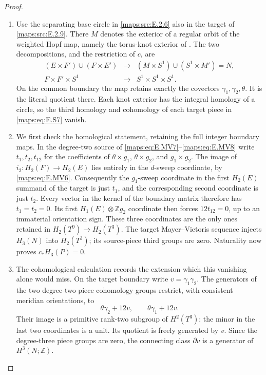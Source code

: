 \begin{proof}
\begin{enumerate}[label=\arabic*.,leftmargin=*]
\item Use the separating base circle in \ref{maps:src:E.2.6} also in the target of
\ref{maps:src:E.2.9}. There $M$ denotes the exterior of a regular orbit of the
weighted Hopf map, namely the torus-knot exterior of . The
two decompositions, and the restriction of $c$, are
\[
 \begin{array}{ccc}
 (E\times F')\cup(F\times E')&\longrightarrow&
                  (M\times S^1)\cup(S^1\times M')=N,\\
 F\times F'\times S^1&\longrightarrow&S^1\times S^1\times S^1.
 \end{array}
 \tag{E.S7}\label{maps:eq:E.S7}
\]
On the common boundary the map retains exactly the covectors
$\gamma_1,\gamma_2,\theta$. It is the literal quotient there.
Each knot exterior has the integral homology of a circle, so the
third homology and cohomology of each target piece in \eqref{maps:eq:E.S7} vanish.

\item We first check the homological statement, retaining the full
integer boundary maps. In the degree-two source of \eqref{maps:eq:E.MV7}--\eqref{maps:eq:E.MV8}
write $t_1,t_2,t_{12}$ for the coefficients of
$\theta\times g_1$, $\theta\times g_2$, and $g_1\times g_2$.
The image of $i_2:H_2(F)\to H_2(E)$ lies entirely in the
$d$-sweep coordinate, by \eqref{maps:eq:E.MV6}. Consequently the $g_1$-sweep
coordinate in the first $H_2(E)$ summand of the target is just
$t_1$, and the corresponding second coordinate is just $t_2$.
Every vector in the kernel of the boundary matrix therefore has
$t_1=t_2=0$. Its first $H_1(E)\otimes\mathbb Zg_2$ coordinate
then forces $12t_{12}=0$, up to an immaterial orientation sign.
These three coordinates are the only ones retained in
$H_2(T^9)\to H_2(T^3)$. The target Mayer--Vietoris sequence
injects $H_3(N)$ into $H_2(T^3)$; its source-piece third groups
are zero. Naturality now proves $c_*H_3(P)=0$.

\item The cohomological calculation records the extension which this
vanishing alone would miss. On the target boundary write
$v=\gamma_1\gamma_2$. The generators of the two degree-two
piece cohomology groups restrict, with consistent meridian
orientations, to
\[
       \theta\gamma_2+12v,
       \qquad \theta\gamma_1+12v.
 \tag{E.S8}\label{maps:eq:E.S8}
\]
Their image is a primitive rank-two subgroup of $H^2(T^3)$:
the minor in the last two coordinates is a unit. Its quotient
is freely generated by $v$. Since the degree-three piece groups
are zero, the connecting class $\partial v$ is a generator of
$H^3(N;\mathbb Z)$.


\end{enumerate}
\end{proof}
